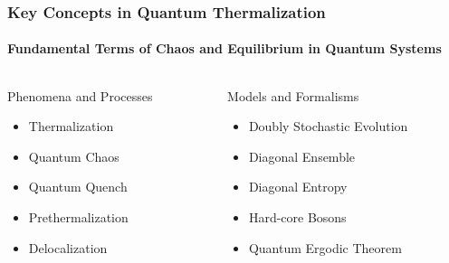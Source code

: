 \begin{frame}
    \frametitle{Key Concepts in Quantum Thermalization}
    \framesubtitle{Fundamental Terms of Chaos and Equilibrium in Quantum Systems}

    \vspace{0.5cm}

    \begin{columns}[T,onlytextwidth] %

        \begin{column}{0.48\textwidth}
            \begin{block}{Phenomena and Processes}
                \begin{itemize}
                    \item Thermalization
                    \item Quantum Chaos
                    \item Quantum Quench
                    \item Prethermalization
                    \item Delocalization
                \end{itemize}
            \end{block}
        \end{column}

        \begin{column}{0.48\textwidth}
            \begin{block}{Models and Formalisms}
                \begin{itemize}
                    \item Doubly Stochastic Evolution
                    \item Diagonal Ensemble
                    \item Diagonal Entropy
                    \item Hard-core Bosons
                    \item Quantum Ergodic Theorem
                \end{itemize}
            \end{block}
        \end{column}

    \end{columns}
\end{frame}
